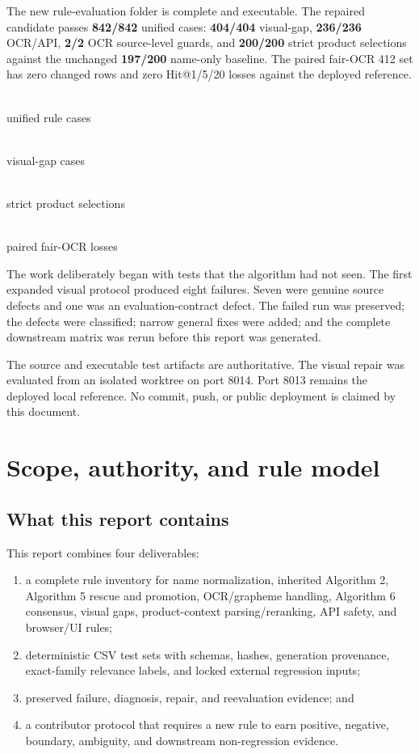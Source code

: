 \documentclass[10pt,oneside]{book}
\newcommand{\metric}[2]{\begin{minipage}[t]{0.23\textwidth}\centering{\headingfont\fontsize{20}{22}\selectfont\color{Navy}#1}\\[-1pt]{\small\color{Muted}#2}\end{minipage}}
\begin{document}
\begin{resultbox}[title=Outcome]
The new rule-evaluation folder is complete and executable. The repaired
candidate passes \textbf{842/842} unified cases: \textbf{404/404} visual-gap,
\textbf{236/236} OCR/API, \textbf{2/2} OCR source-level guards, and
\textbf{200/200} strict product selections against the unchanged
\textbf{197/200} name-only baseline. The paired fair-OCR 412 set has zero
changed rows and zero Hit@1/5/20 losses against the deployed reference.
\end{resultbox}

\vspace{0.5em}
\noindent
\metric{842/842}{unified rule cases}\hfill
\metric{404/404}{visual-gap cases}\hfill
\metric{200/200}{strict product selections}\hfill
\metric{0}{paired fair-OCR losses}

\vspace{1.2em}
The work deliberately began with tests that the algorithm had not seen. The
first expanded visual protocol produced eight failures. Seven were genuine
source defects and one was an evaluation-contract defect. The failed run was
preserved; the defects were classified; narrow general fixes were added; and
the complete downstream matrix was rerun before this report was generated.

\begin{warningbox}[title=Authority boundary]
The source and executable test artifacts are authoritative. The visual repair
was evaluated from an isolated worktree on port 8014. Port 8013 remains the
deployed local reference. No commit, push, or public deployment is claimed by
this document.
\end{warningbox}

\tableofcontents

\mainmatter

\chapter{Scope, authority, and rule model}

\section{What this report contains}

This report combines four deliverables:

\begin{enumerate}
\item a complete rule inventory for name normalization, inherited Algorithm 2,
Algorithm 5 rescue and promotion, OCR/grapheme handling, Algorithm 6 consensus,
visual gaps, product-context parsing/reranking, API safety, and browser/UI rules;
\item deterministic CSV test sets with schemas, hashes, generation provenance,
exact-family relevance labels, and locked external regression inputs;
\item preserved failure, diagnosis, repair, and reevaluation evidence; and
\item a contributor protocol that requires a new rule to earn positive,
negative, boundary, ambiguity, and downstream non-regression evidence.
\end{enumerate}
\end{document}
